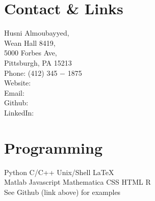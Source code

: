\documentclass[]{deedy-resume-openfont}
\begin{document}
%
%

%
%


%
%

\begin{minipage}[t]{0.33\textwidth} 




\section{\color{Blue} Contact \& Links} 
Husni Almoubayyed,\\ 
Wean Hall 8419, \\ 5000 Forbes Ave, \\ Pittsburgh, PA 15213 \\
Phone: (412) 345 $-$ 1875 \\
Website: \href{https://www.husni.space}{} \\
Email: \href{mailto:husnial@cmu.edu}{} \\
Github: \href{https://github.com/hsnee}{} \\
LinkedIn:  \href{https://www.linkedin.com/in/husnialmoubayyed}{} 
\sectionsep




\section{\color{Blue} Programming}
\textbullet{} Python \textbullet{}  C/C++ \textbullet{} Unix/Shell \textbullet{} \LaTeX  \\
\textbullet{} Matlab \textbullet{} Javascript \textbullet{} Mathematica  \textbullet{} CSS \textbullet{} HTML \textbullet{} R \\
See Github (link above) for examples
\sectionsep



\end{minipage}
\end{document}
